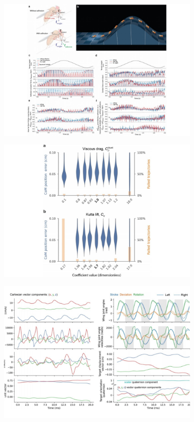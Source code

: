 \documentclass[sn-mathphys-num]{sn-jnl}%
\theoremstyle{thmstyleone}%
\theoremstyle{thmstyletwo}%
\theoremstyle{thmstylethree}%
\begin{document}
\begin{figure}[!htb] 
	\centering
	\includegraphics[width=0.9\textwidth]{fig/extended_fig_3.pdf}
	\caption{}
	\label{fig:extended_fig_3}
\end{figure}


\begin{figure}[!htb] 
	\centering
	\includegraphics[width=0.9\textwidth]{fig/extended_fig_4.pdf}
	\caption{}
	\label{fig:extended_fig_4}
\end{figure}


\begin{figure}[!htb] 
	\centering
	\includegraphics[width=0.9\textwidth]{fig/extended_fig_5.pdf}
	\caption{}
	\label{fig:extended_fig_5}
\end{figure}
\end{document}
